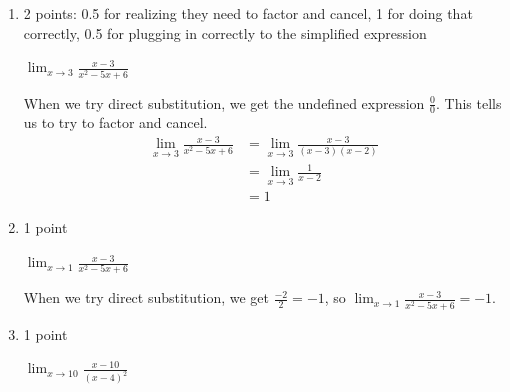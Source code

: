 \documentclass{article}
\begin{document}
\begin{enumerate}
  \begin{enumerate}

  \item \label{evaluate-limits-1-0/0}

    \begin{grading}
      2 points: 0.5 for realizing they need to factor and cancel, 1 for doing that correctly, 0.5 for plugging in correctly to the simplified expression 
    \end{grading}

    \begin{problem}[\vfill]
      $\displaystyle \lim_{x \to 3} \frac{x - 3}{x^2 - 5x + 6}$
    \end{problem}

    \begin{solution}
      When we try direct substitution, we get the undefined expression $\frac{0}{0}$. This tells us to try
      to factor and cancel.
      \begin{align*}
        \lim_{x \to 3} \frac{x-3}{x^2-5x+6} &= \lim_{x \to 3} \frac{x-3}{(x-3)(x-2)}\\
        &= \lim_{x \to 3} \frac{1}{x-2} \\
        &= 1
      \end{align*}
    \end{solution}

  \item

    \begin{grading}
      1 point
    \end{grading}

    \begin{problem}[\vfill]
      $\displaystyle \lim_{x \to 1} \frac{x - 3}{x^2 - 5x + 6}$
    \end{problem}

    \begin{solution}
      When we try direct substitution, we get $\frac{-2}{2}=-1$, so 
      $\displaystyle \lim_{x \to 1} \frac{x - 3}{x^2 - 5x + 6}=-1$.
    \end{solution}

  \item

    \begin{grading}
      1 point
    \end{grading}

    \begin{problem}[\vfill]
      $\displaystyle \lim_{x \to 10} \frac{x - 10}{(x - 4)^2}$
    \end{problem}


\end{enumerate}
\end{enumerate}
\end{document}
